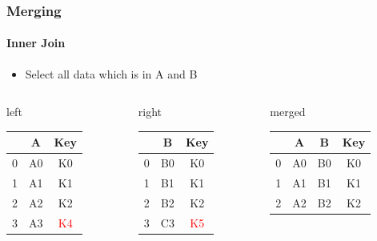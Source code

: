 \documentclass[12pt,ngerman]{beamer}
\def\firstcircle{(0,0) circle (2cm)}
\def\secondcircle{(0:3cm) circle (2cm)}
\begin{document}
\begin{frame}
\frametitle{Merging}
\framesubtitle{Inner Join}

\begin{itemize}
\item Select all data which is in A and B
\end{itemize}

\begin{center}
\end{center}

{\footnotesize
\begin{columns}
\begin{column}{0.3\textwidth}
left \\
\begin{tabular}{c|cc} \toprule
   & A  &  Key \\ \midrule
0 & A0 &  K0 \\
1 & A1 &  K1 \\ 
2 & A2 &  K2 \\
3 & A3 &  \textcolor{red}{K4} \\ \bottomrule
\end{tabular}
\end{column}
\begin{column}{0.3\textwidth}
right \\
\begin{tabular}{c|cc} \toprule
   &  B   & Key \\ \midrule
0 &  B0 & K0 \\
1 &  B1 & K1 \\ 
2 &  B2 & K2 \\
3 &  C3 & \textcolor{red}{K5} \\ \bottomrule
\end{tabular}\end{column}
\begin{column}{0.3\textwidth}
merged \\
\begin{tabular}{c|ccc} \toprule
   & A  & B   & Key \\ \midrule
0 & A0 & B0 & K0 \\
1 & A1 & B1 & K1 \\ 
2 & A2 & B2 & K2 \\ \bottomrule
\end{tabular} \\
\vspace*{1.5em}
\end{column}
\end{columns}}


\end{frame}
\end{document}
